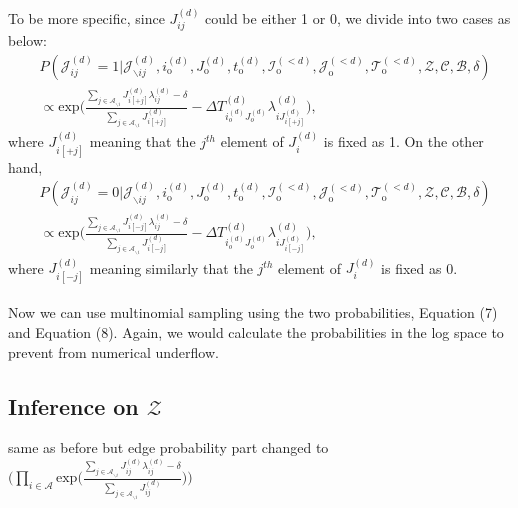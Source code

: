 \documentclass[a4paper]{article}
\begin{document}
       To be more specific, since ${J}^{(d)}_{ij}$ could be either 1 or 0, we divide into two cases as below:
       \begin{equation}
       \begin{aligned}
       &P(\mathcal{J}^{(d)}_{ij}=1| \mathcal{J}^{(d)}_{\backslash ij}, i^{(d)}_{\mbox{o}}, J^{(d)}_{\mbox{o}}, t^{(d)}_{\mbox{o}}, \mathcal{I}^{(<d)}_{\mbox{o}}, \mathcal{J}^{(<d)}_{\mbox{o}}, \mathcal{T}^{(<d)}_{\mbox{o}}, \mathcal{Z}, \mathcal{C}, \mathcal{B}, \delta)\\& \propto \mbox{exp}\Big({\frac{\sum_{j \in \mathcal{A}_{\backslash i}}J^{(d)}_{i[+j]}\lambda^{(d)}_{ij} - \delta}{\sum\limits_{j \in \mathcal{A}_{\backslash i}}J^{(d)}_{i[+j]}}-\Delta T^{(d)}_{i_o^{(d)}J_o^{(d)}}\lambda^{(d)}_{iJ^{(d)}_{ i[+j]}}}\Big),
       \end{aligned}
       \end{equation}
       where $J^{(d)}_{i[+j]}$ meaning that the $j^{th}$ element of $J_{i}^{(d)}$ is fixed as 1. On the other hand, 
       \begin{equation}
       \begin{aligned}
       &P(\mathcal{J}^{(d)}_{ij}=0| \mathcal{J}^{(d)}_{\backslash ij}, i^{(d)}_{\mbox{o}}, J^{(d)}_{\mbox{o}}, t^{(d)}_{\mbox{o}}, \mathcal{I}^{(<d)}_{\mbox{o}}, \mathcal{J}^{(<d)}_{\mbox{o}}, \mathcal{T}^{(<d)}_{\mbox{o}}, \mathcal{Z}, \mathcal{C}, \mathcal{B}, \delta)\\& \propto \mbox{exp}\Big({\frac{\sum_{j \in \mathcal{A}_{\backslash i}}J^{(d)}_{i[-j]}\lambda^{(d)}_{ij} - \delta}{\sum\limits_{j \in \mathcal{A}_{\backslash i}}J^{(d)}_{i[-j]}}-\Delta T^{(d)}_{i_o^{(d)}J_o^{(d)}}\lambda^{(d)}_{iJ^{(d)}_{ i[-j]}}}\Big),
       \end{aligned}
       \end{equation}
       where $J^{(d)}_{i[-j]}$ meaning similarly that the $j^{th}$ element of $J_{i}^{(d)}$ is fixed as 0. \\\\ \newline Now we can use multinomial sampling using the two probabilities, Equation (7) and Equation (8). Again, we would calculate the probabilities in the log space to prevent from numerical underflow. 
           \subsection{Inference on $\mathcal{Z}$}
      same as before but edge probability part changed to $\Big(\prod_{i\in \mathcal{A}}\mbox{exp}\Big(\frac{\sum_{j \in \mathcal{A}_{\backslash i}}J^{(d)}_{ij}\lambda^{(d)}_{ij} - \delta}{\sum\limits_{j \in \mathcal{A}_{\backslash i}}J^{(d)}_{ij}}\Big)\Big)$
\end{document}
